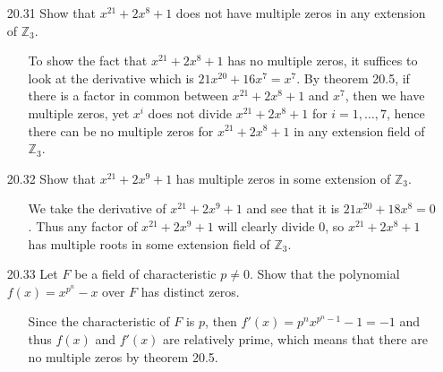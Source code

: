 \documentclass[12pt]{article}
\begin{document}
\begin{enumerate}
\item[20.31] Show that $x^{21} + 2x^8 + 1$ does not have multiple zeros in any extension
of $\mathbb{Z}_3$.
\begin{enumerate}
\item[] To show the fact that $x^{21} + 2x^8 + 1$ has no multiple zeros, it suffices to look 
at the derivative which is $21x^{20} + 16x^7 = x^7$. By theorem 20.5, if there is a factor
in common between $x^{21} + 2x^8 + 1$ and $x^7$, then we have multiple zeros, yet
$x^i$ does not divide $x^{21} + 2x^8 + 1$ for $i = 1, \ldots, 7$, hence there
can be no multiple zeros for $x^{21} + 2x^8 + 1$ in any extension field of $\mathbb{Z}_3$.
\end{enumerate}

\item[20.32] Show that $x^{21} + 2x^9 + 1$ has multiple zeros in some extension of 
$\mathbb{Z}_3$.
\begin{enumerate}
\item[] We take the derivative of $x^{21} + 2x^9 + 1$ and see that it is $21x^{20} + 18x^8 = 0$.
Thus any factor of $x^{21} + 2x^9 + 1$ will clearly divide 0, so $x^{21} + 2x^8 + 1$ has
multiple roots in some extension field of $\mathbb{Z}_3$.
\end{enumerate}

\item[20.33] Let $F$ be a field of characteristic $p \neq 0$. Show that the polynomial
$f(x) = x^{p^n} - x$ over $F$ has distinct zeros.
\begin{enumerate}
\item[] Since the characteristic of $F$ is $p$, then $f'(x) = p^nx^{p^n - 1} - 1 = -1$ and
thus $f(x)$ and $f'(x)$ are relatively prime, which means that there are no multiple zeros
by theorem 20.5.
\end{enumerate}


\end{enumerate}
\end{document}
